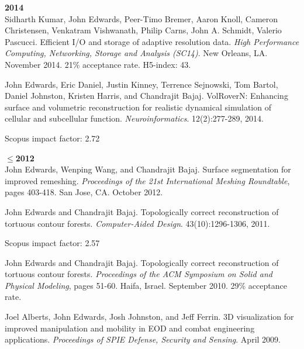 \documentclass[margin,line]{res}
\newcommand{\pubunder}[1]{#1}
\begin{document}
\begin{resume}
\textbf{2014} \\
Sidharth Kumar, \pubunder{John Edwards}, Peer-Timo Bremer, Aaron Knoll, Cameron Christensen, Venkatram Vishwanath, Philip Carns, John A. Schmidt, Valerio Pascucci. Efficient I/O and storage of adaptive resolution data. \textit{High Performance Computing, Networking, Storage and Analysis (SC14)}. New Orleans, LA. November 2014. 21\% acceptance rate. H5-index: 43.

\pubunder{John Edwards}, Eric Daniel, Justin Kinney, Terrence Sejnowski, Tom Bartol, Daniel Johnston, Kristen Harris, and Chandrajit Bajaj. VolRoverN: Enhancing surface and volumetric reconstruction for realistic dynamical simulation of cellular and subcellular function.  \textit{Neuroinformatics}. 12(2):277-289, 2014.
\begin{IMPACT}
Scopus impact factor: 2.72 %
\end{IMPACT}

\textbf{$\le$2012} \\
\pubunder{John Edwards}, Wenping Wang, and Chandrajit Bajaj. Surface segmentation for improved remeshing. \textit{Proceedings of the 21st International Meshing Roundtable}, pages 403-418. San Jose, CA. October 2012.

\protect \pubunder{John Edwards} and Chandrajit Bajaj. Topologically correct reconstruction of tortuous contour forests. \textit{Computer-Aided Design}. 43(10):1296-1306, 2011.
\begin{IMPACT}
Scopus impact factor: 2.57 %
\end{IMPACT}

\pubunder{John Edwards} and Chandrajit Bajaj. Topologically correct reconstruction of tortuous contour forests. \textit{Proceedings of the ACM Symposium on Solid and Physical Modeling}, pages 51-60. Haifa, Israel. September 2010. 29\% acceptance rate.

Joel Alberts, \pubunder{John Edwards}, Josh Johnston, and Jeff Ferrin. 3D visualization for improved manipulation and mobility in EOD and combat engineering applications. \textit{Proceedings of SPIE Defense, Security and Sensing}. April 2009.


\end{resume}
\end{document}

